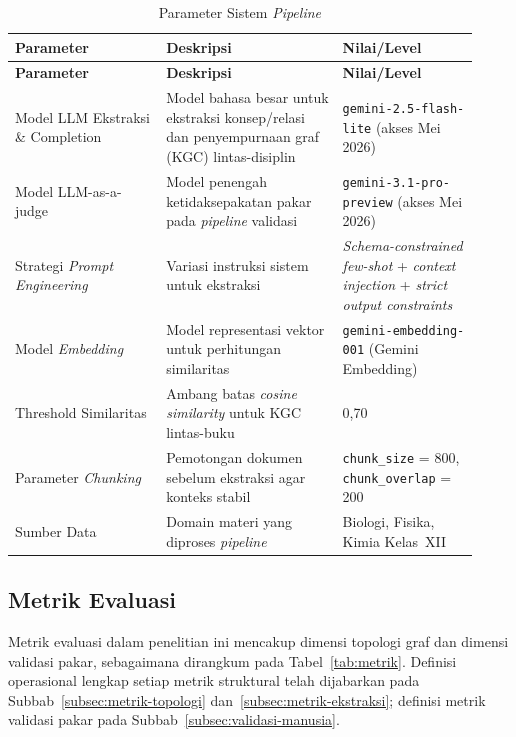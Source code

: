 \documentclass[main]{subfiles}
\begin{document}
\begin{longtable}{@{}p{0.30\linewidth}p{0.35\linewidth}p{0.27\linewidth}@{}}
  \caption{Parameter Sistem \textit{Pipeline}}
  \label{tab:parameter}\\
  \toprule
  \textbf{Parameter} & \textbf{Deskripsi} & \textbf{Nilai/Level} \\
  \midrule
  \endfirsthead
  \toprule
  \textbf{Parameter} & \textbf{Deskripsi} & \textbf{Nilai/Level} \\
  \midrule
  \endhead
  \midrule
  \endfoot
  \bottomrule
  \endlastfoot
  Model LLM Ekstraksi \& Completion
    & Model bahasa besar untuk ekstraksi konsep/relasi dan
      penyempurnaan graf (KGC) lintas-disiplin
    & {\scriptsize \texttt{gemini-2.5-flash-lite} (akses Mei 2026)} \\
  Model LLM-as-a-judge
    & Model penengah ketidaksepakatan pakar pada \textit{pipeline} validasi
    & {\scriptsize \texttt{gemini-3.1-pro-preview} (akses Mei 2026)} \\
  Strategi \textit{Prompt Engineering}
    & Variasi instruksi sistem untuk ekstraksi
    & \textit{Schema-constrained few-shot} + \textit{context injection}
      + \textit{strict output constraints} \\
  Model \textit{Embedding}
    & Model representasi vektor untuk perhitungan similaritas
    & \texttt{gemini-embedding-001} (Gemini Embedding) \\
  Threshold Similaritas
    & Ambang batas \textit{cosine similarity} untuk KGC lintas-buku
    & 0,70 \\
  Parameter \textit{Chunking}
    & Pemotongan dokumen sebelum ekstraksi agar konteks stabil
    & \texttt{chunk\_size} = 800, \texttt{chunk\_overlap} = 200 \\
  Sumber Data
    & Domain materi yang diproses \textit{pipeline}
    & Biologi, Fisika, Kimia Kelas~XII \\
\end{longtable}

\subsection{Metrik Evaluasi}\label{subsec:metrik-evaluasi}

Metrik evaluasi dalam penelitian ini mencakup dimensi topologi graf dan
dimensi validasi pakar, sebagaimana dirangkum pada
Tabel~\ref{tab:metrik}. Definisi operasional lengkap setiap metrik
struktural telah dijabarkan pada Subbab~\ref{subsec:metrik-topologi}
dan~\ref{subsec:metrik-ekstraksi}; definisi
metrik validasi pakar pada Subbab~\ref{subsec:validasi-manusia}.
\end{document}
